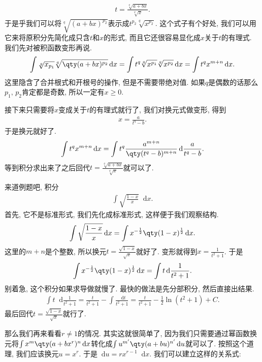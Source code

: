\documentclass{ctexbook}
\newcommand*{\dif}{\mathop{}\!\mathrm{d}}
\begin{document}
{\begin{align*}
t=\frac{\sqrt[q]{a+bx}}{\sqrt[q]{x}}
.\end{align*}
于是乎我们可以将$\sqrt[q]{(a+bx)^{p_{2}}}$表示成$t^{p_{2}}\sqrt[q]{x^{p_{2}}}$. 这个式子有个好处, 我们可以用它来将原积分先简化成只含$t$和$x$的形式, 而且它还很容易显化成$x$关于$t$的有理式. 我们先对被积函数变形再说. 
\begin{align*}
\int\sqrt[q]{x_{p_{1}}}\sqrt[q]{\qty(a+bx)^{p_{2}}}\dif{x}=\int t^{q}\sqrt[q]{x^{p_{1}}}\sqrt[q]{x^{p_{2}}}\dif{x}=\int t^{q}x^{m+n}\dif{x}
.\end{align*}
这里隐含了合并根式和开根号的操作, 但是不需要带绝对值. 如果$q$是偶数的话那么$p_{1},\,p_{2}$肯定都是奇数, 所以一定有$x\ge0$.\par
接下来只需要将$x$变成关于$t$的有理式就行了, 我们对换元式做变形, 得到
\begin{align*}
x=\frac{a}{t^{q}-b}
.\end{align*}
于是换元就好了. 
\begin{align*}
\int t^{q}x^{m+n}\dif{x}=\int t^{q}\frac{a^{m+n}}{\qty(t^{q}-b)^{m+n}}\dif{\frac{a}{t^{q}-b}}
.\end{align*}
等到积分求出来了之后回代$t=\frac{\sqrt[q]{a+bx}}{\sqrt[q]{x}}$就可以了. \par
来道例题吧, 积分
\begin{align*}
\int\sqrt{\frac{1-x}{x}}\dif{x}
.\end{align*}
首先, 它不是标准形式, 我们先化成标准形式, 这样便于我们观察结构. 
\begin{align*}
\int\sqrt{\frac{1-x}{x}}\dif{x}=\int x^{-\frac{1}{2}}\qty(1-x)^{\frac{1}{2}}\dif{x}
.\end{align*}
这里的$m+n$是个整数, 所以换元$t=\frac{\sqrt{1-x}}{\sqrt{x}}$就好了. 变形就得到$x=\frac{1}{t^{2}+1}$. 于是
\begin{align*}
\int x^{-\frac{1}{2}}\qty(1-x)^{\frac{1}{2}}\dif{x}=\int t\dif{\frac{1}{t^{2}+1}}
.\end{align*}
别着急, 这个积分如果求导做就慢了. 最快的做法是先分部积分, 然后直接出结果. 
\begin{align*}
\int t\dif{\frac{1}{t^{2}+1}}=\frac{t}{t^{2}+1}-\int\frac{\dif{t}}{t^{2}+1}=\frac{t}{t^{2}+1}-\frac{1}{2}\ln(t^{2}+1)+C
.\end{align*}
最后回代$t=\frac{\sqrt{1-x}}{\sqrt{x}}$就行了. \par
那么我们再来看看$r\ne1$的情况. 其实这就很简单了, 因为我们只需要通过幂函数换元将$\int x^{m}\qty(a+bx^{r})^{n}\dif{x}$转化成$\int u^{m'}\qty(a+bu)^{n'}\dif{u}$就可以了. 按照这个道理, 我们应该换元$u=x^{r}$. 于是$\dif{u}=rx^{r-1}\dif{x}$. 我们可以建立这样的关系式: 
}
\end{document}
